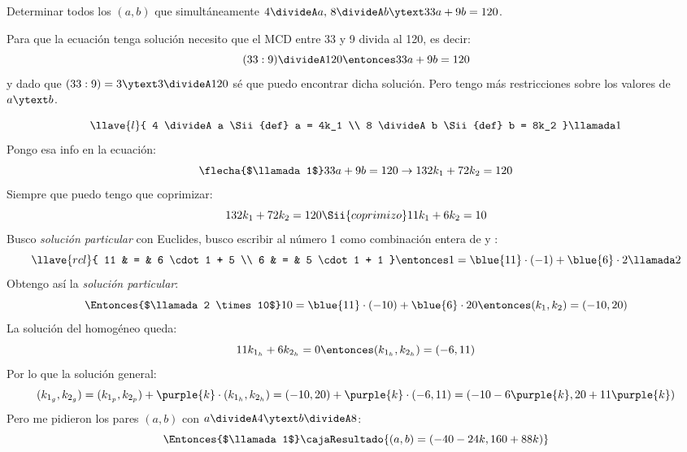 \begin{enunciado}{\ejercicio}
  Determinar todos los $(a,b)$ que simultáneamente $4 \divideA a,\, 8 \divideA b \ytext 33a + 9b = 120$.
\end{enunciado}

Para que la ecuación tenga solución necesito que el MCD entre 33 y 9 divida al 120, es decir:
$$
  (33:9) \divideA 120 \entonces 33a + 9b = 120
$$
y dado que $(33:9) = 3
  \ytext
  3\divideA 120$ sé que puedo encontrar dicha solución. Pero tengo más restricciones sobre
los valores de $a \ytext b$.

$$
  \llave{l}{
    4 \divideA a \Sii{def} a = 4k_1 \\
    8 \divideA b \Sii{def} b = 8k_2
  } \llamada1
$$
Pongo esa info en la ecuación:
$$
  \flecha{$\llamada1$}
  33a + 9b = 120
  \to
  132 k_1 + 72 k_2 = 120
$$
Siempre que puedo tengo que coprimizar:
$$
  132 k_1 + 72 k_2 = 120
  \Sii{coprimizo}
  11 k_1 + 6 k_2 = 10
$$
Busco \textit{solución particular} con Euclides, busco escribir al número 1 como combinación entera de  y :
$$
  \llave{rcl}{
    11 & = & 6 \cdot 1 + 5 \\
    6  & = & 5 \cdot 1 + 1
  }
  \entonces
  1 =  \blue{11} \cdot (-1) + \blue{6} \cdot 2 \llamada2
$$
Obtengo así la \textit{solución particular}:
$$
  \Entonces{$\llamada2 \times 10$}
  10 = \blue{11}\cdot(-10)   + \blue{6} \cdot 20
  \entonces
  (k_1, k_2) = (-10, 20)
$$
La solución del homogéneo queda:
$$
  11 k_{1_h} + 6 k_{2_h} = 0 \entonces (k_{1_h}, k_{2_h}) = (-6, 11)
$$
Por lo que la solución general:
$$
  (k_{1_g}, k_{2_g}) = (k_{1_p}, k_{2_p}) + \purple{k} \cdot (k_{1_h}, k_{2_h}) =
  (-10, 20) + \purple{k} \cdot (-6, 11) =
  (-10 - 6\purple{k}, 20 + 11\purple{k})
$$
Pero me pidieron los pares $(a,b)$ con $a \divideA 4 \ytext b \divideA 8$:
$$
  \Entonces{$\llamada1$}
  \cajaResultado{
    (a,b) = (-40 - 24k, 160 + 88k)
  }
$$

\begin{aportes}
  \item {}
\end{aportes}

